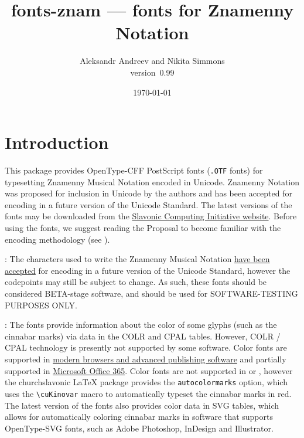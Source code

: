 \documentclass[11pt]{article}
\def\fileversion{0.99}
\def\pkg#1{\textsf{#1}}
\def\cs#1{\texttt{\textbackslash #1}}
\begin{document}
\title{\pkg{fonts-znam} --- fonts for Znamenny Notation}
\author{Aleksandr Andreev and Nikita Simmons\\version~\fileversion}
\date{\today}
\maketitle

\tableofcontents

\section{Introduction}
This package provides OpenType-CFF PostScript fonts (\texttt{.OTF} fonts)
for typesetting Znamenny Musical Notation encoded in Unicode. Znamenny
Notation was proposed for inclusion in Unicode by the authors and has
been accepted for encoding in a future version of the Unicode Standard.
The latest versions of the fonts may be downloaded from the
\href{https://sci.ponomar.net/music.html}{Slavonic Computing Initiative website}.
Before using the fonts, we suggest reading the Proposal to become familiar with
the encoding methodology (see \cite{PROP}).

: The characters used to write the Znamenny Musical Notation
\href{http://www.unicode.org/alloc/Pipeline.html}{have been accepted}
for encoding in a future version of the Unicode Standard,
however the codepoints may still be subject to change. As such,
these fonts should be considered BETA-stage software, and should be used
for SOFTWARE-TESTING PURPOSES ONLY.

: The fonts provide information about the color of some
glyphs (such as the cinnabar marks) via data in the COLR and CPAL tables.
However, COLR / CPAL technology is presently not supported by some software.
Color fonts are supported in \href{https://www.colorfonts.wtf/}{modern browsers
and advanced publishing software} and partially supported in
\href{https://office-watch.com/2019/color-font-support-in-microsoft-office-the-story-so-far/}{Microsoft
Office 365}. Color fonts are not supported in \XeTeX{} or \LuaTeX{}, however
the \pkg{churchslavonic} \LaTeX{} package provides the \texttt{autocolormarks} option,
which uses the \cs{cuKinovar} macro to automatically typeset the cinnabar marks in red.
The latest version of the fonts also provides color data in SVG tables,
which allows for automatically coloring cinnabar marks in software that
supports OpenType-SVG fonts, such as Adobe Photoshop, InDesign and Illustrator.
\end{document}
